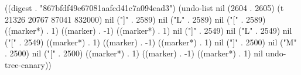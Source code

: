 
((digest . "867bfdf49e67081aafcd41c7a094ead3") (undo-list nil (2604 . 2605) (t 21326 20767 87041 832000) nil ("]" . 2589) nil ("L" . 2589) nil ("[" . 2589) ((marker*) . 1) ((marker) . -1) ((marker*) . 1) nil ("]" . 2549) nil ("L" . 2549) nil ("[" . 2549) ((marker*) . 1) ((marker) . -1) ((marker*) . 1) nil ("]" . 2500) nil ("M" . 2500) nil ("[" . 2500) ((marker*) . 1) ((marker) . -1) ((marker*) . 1) nil undo-tree-canary))
